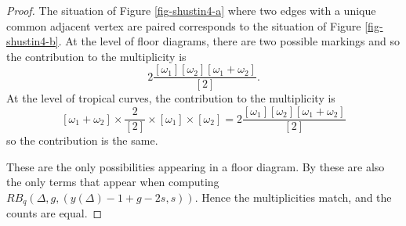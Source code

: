 \documentclass[11pt]{article}
\theoremstyle{definition}
\numberwithin{equation}{section}
\theoremstyle{plain}
\begin{document}
\begin{proof}
The situation of Figure \ref{fig-shustin4-a} where two edges with a unique common adjacent vertex are paired corresponds to the situation of Figure \ref{fig-shustin4-b}. At the level of floor diagrams, there are two possible markings and so the contribution to the multiplicity is
\[ 2 \dfrac{[\omega_1][\omega_2][\omega_1+\omega_2]}{[2]}. \]
At the level of tropical curves, the contribution to the multiplicity is
\[ [\omega_1+\omega_2] \times  \dfrac{2}{[2]} \times [\omega_1] \times [\omega_2] = 2 \dfrac{[\omega_1][\omega_2][\omega_1+\omega_2]}{[2]} \]
so the contribution is the same.

These are the only possibilities appearing in a floor diagram. By \cite[Lemma 4.6]{shustin-2024-refined} these are also the only terms that appear when computing $RB_q(\Delta,g,(y(\Delta)-1+g-2s,s))$. Hence the multiplicities match, and the counts are equal.
\end{proof}
\end{document}
